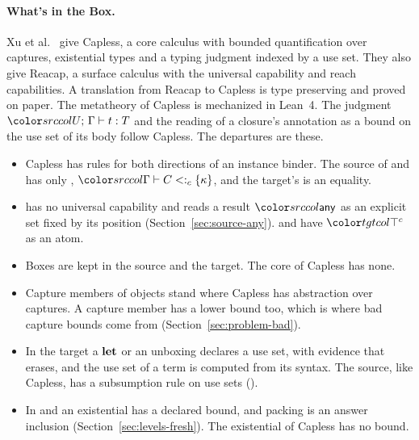 \paragraph{What's in the Box.}
Xu et al.\ \cite{xu2025box} give Capless, a core calculus with bounded quantification over captures, existential types and a typing judgment indexed by a use set. They also give Reacap, a surface calculus with the universal capability and reach capabilities. A translation from Reacap to Capless is type preserving and proved on paper. The metatheory of Capless is mechanized in Lean~4. The judgment $\dtyuj{U}{\Gamma}{t}{T}$ and the reading of a closure's annotation as a bound on the use set of its body follow Capless. The departures are these.
\begin{itemize}
\item Capless has rules for both directions of an instance binder. The source of \treeCC and \treeCL has only , $\subcj{\Gamma}{C}{\cset{\kappa}}$, and the target's  is an equality.
\item \treeK has no universal capability and reads a result $\cany$ as an explicit set fixed by its position (Section~\ref{sec:source-any}). \treeCC and \treeCL have $\topc$ as an atom.
\item Boxes are kept in the source and the target. The core of Capless has none.
\item Capture members of objects stand where Capless has abstraction over captures. A capture member has a lower bound too, which is where bad capture bounds come from (Section~\ref{sec:problem-bad}).
\item In the target a $\mathbf{let}$ or an unboxing declares a use set, with evidence that erases, and the use set of a term is computed from its syntax. The source, like Capless, has a subsumption rule on use sets ().
\item In \treeCC and \treeCL an existential has a declared bound, and packing is an answer inclusion (Section~\ref{sec:levels-fresh}). The existential of Capless has no bound.
\end{itemize}


